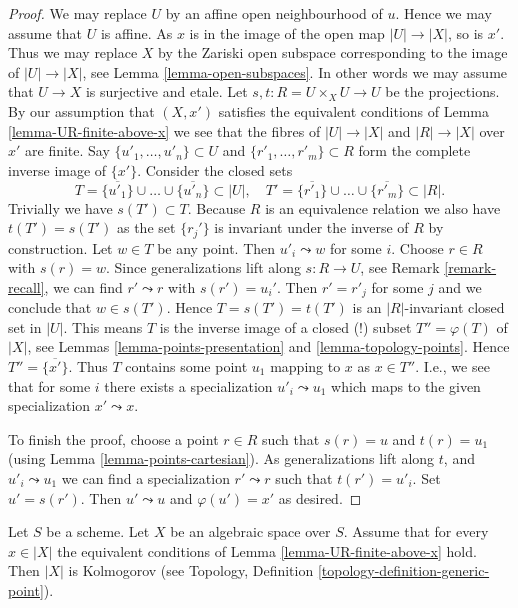 \begin{proof}
We may replace $U$ by an affine open neighbourhood of $u$.
Hence we may assume that $U$ is affine. As $x$ is in the
image of the open map $|U| \to |X|$, so is $x'$. Thus we may
replace $X$ by the Zariski open subspace corresponding to
the image of $|U| \to |X|$, see
Lemma \ref{lemma-open-subspaces}.
In other words we may assume that
$U \to X$ is surjective and etale.
Let $s, t : R = U \times_X U \to U$ be the projections.
By our assumption that $(X, x')$ satisfies the equivalent conditions
of Lemma \ref{lemma-UR-finite-above-x} we see that the fibres
of $|U| \to |X|$ and $|R| \to |X|$
over $x'$ are finite. Say $\{u'_1, \ldots, u'_n\} \subset U$ and
$\{r'_1, \ldots, r'_m\} \subset R$ form the complete inverse image
of $\{x'\}$.
Consider the closed sets
$$
T = \overline{\{u'_1\}} \cup \ldots \cup \overline{\{u'_n\}} \subset |U|,
\quad
T' = \overline{\{r'_1\}} \cup \ldots \cup \overline{\{r'_m\}} \subset |R|.
$$
Trivially we have $s(T') \subset T$. Because $R$ is an equivalence
relation we also have $t(T') = s(T')$ as the set $\{r_j'\}$
is invariant under the inverse of $R$ by construction. Let $w \in T$
be any point. Then $u'_i \leadsto w$ for some $i$. Choose $r \in R$
with $s(r) = w$. Since generalizations lift along $s : R \to U$, see
Remark \ref{remark-recall}, we can find $r' \leadsto r$ with
$s(r') = u_i'$. Then $r' = r'_j$ for some $j$ and we conclude that
$w \in s(T')$. Hence $T = s(T') = t(T')$ is an $|R|$-invariant closed
set in $|U|$. This means $T$ is the inverse image of a closed (!)
subset $T'' = \varphi(T)$ of $|X|$, see
Lemmas \ref{lemma-points-presentation} and \ref{lemma-topology-points}.
Hence $T'' = \overline{\{x'\}}$.
Thus $T$ contains some point $u_1$ mapping to $x$ as $x \in T''$.
I.e., we see that for some $i$ there exists a specialization
$u'_i \leadsto u_1$ which maps to the given specialization
$x' \leadsto x$.

\medskip\noindent
To finish the proof, choose a point $r \in R$ such that
$s(r) = u$ and $t(r) = u_1$ (using Lemma \ref{lemma-points-cartesian}).
As generalizations lift along $t$, and $u'_i \leadsto u_1$
we can find a specialization $r' \leadsto r$ such that $t(r') = u'_i$.
Set $u' = s(r')$. Then $u' \leadsto u$ and $\varphi(u') = x'$ as
desired.
\end{proof}

\begin{lemma}
\label{lemma-kolmogorov}
Let $S$ be a scheme.
Let $X$ be an algebraic space over $S$.
Assume that for every $x \in |X|$ the equivalent conditions
of Lemma \ref{lemma-UR-finite-above-x} hold.
Then $|X|$ is Kolmogorov (see
Topology, Definition \ref{topology-definition-generic-point}).
\end{lemma}

